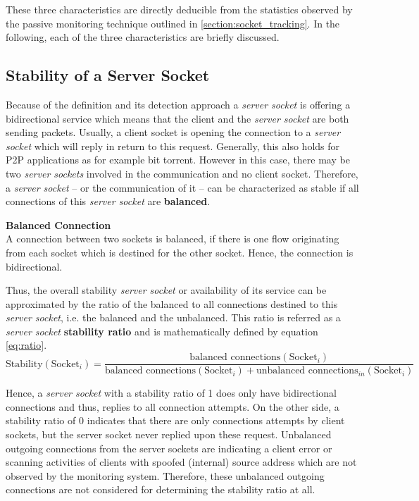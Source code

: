 These three characteristics are directly deducible from the statistics observed by the passive monitoring technique outlined in \ref{section:socket_tracking}. In the following, each of the three characteristics are briefly discussed.

\subsection{Stability of a Server Socket} Because of the definition and its detection approach a \emph{server socket} is offering a bidirectional service which means that the client and the \emph{server socket} are both sending packets. Usually, a client socket is opening the connection to a \emph{server socket} which will reply in return to this request. Generally, this also holds for P2P applications as for example bit torrent. However in this case, there may be two \emph{server sockets} involved in the communication and no client socket. Therefore, a \emph{server socket} -- or the communication of it -- can be characterized as stable if all connections of this \emph{server socket} are \textbf{balanced}. 

\parbox{ 
\textwidth}{ 
\begin{defn}
	{\textbf{Balanced Connection}\\} A connection between two sockets is balanced, if there is one flow originating from each socket which is destined for the other socket. Hence, the connection is bidirectional. 
\end{defn}
}

Thus, the overall stability \emph{server socket} or availability of its service can be approximated by the ratio of the balanced to all connections destined to this \emph{server socket}, i.e. the balanced and the unbalanced. This ratio is referred as a \emph{server socket} \textbf{stability ratio} and is mathematically defined by equation \ref{eq:ratio}. 
\begin{equation}
	\text{Stability}(\text{Socket}_i) = \frac{\text{balanced connections}(\text{Socket}_i)}{\text{balanced connections}(\text{Socket}_i) + \text{unbalanced connections}_{in}(\text{Socket}_i)} 
	\label{eq:ratio} 
\end{equation}

Hence, a \emph{server socket} with a stability ratio of 1 does only have bidirectional connections and thus, replies to all connection attempts. On the other side, a stability ratio of 0 indicates that there are only connections attempts by client sockets, but the server socket never replied upon these request. Unbalanced outgoing connections from the server sockets are indicating a client error or scanning activities of clients with spoofed (internal) source address which are not observed by the monitoring system. Therefore, these unbalanced outgoing connections are not considered for determining the stability ratio at all.

